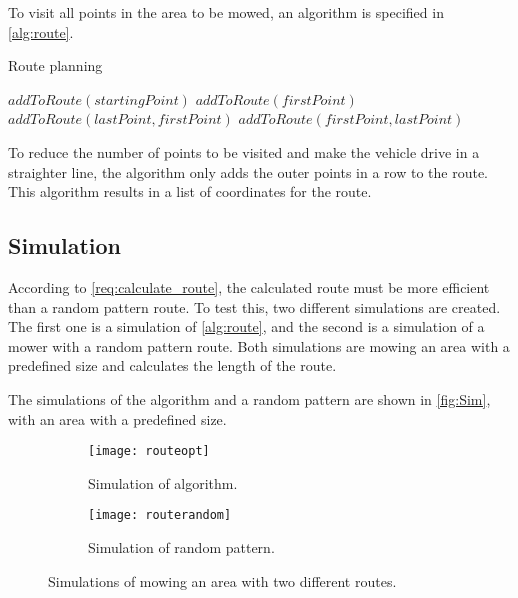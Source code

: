 To visit all points in the area to be mowed, an algorithm is specified in \autoref{alg:route}.
\algrenewcommand{}
\begin{algorithm}[htb]
\caption{Route planning}\label{alg:route}
\begin{algorithmic}[1]
\Statex
{}
   \EndFor
\EndProcedure
\Statex
{}
\State $addToRoute(startingPoint)$
\EndProcedure
\Statex
{}
\State $addToRoute(firstPoint)$
\EndProcedure
\Statex 
{}
\State $addToRoute(lastPoint , firstPoint)$
\EndProcedure
\Statex 
{}
\State $addToRoute(firstPoint , lastPoint)$
\EndProcedure
\EndWhile
\end{algorithmic}
\end{algorithm}
To reduce the number of points to be visited and make the vehicle drive in a straighter line, the algorithm only adds the outer points in a row to the route.
This algorithm results in a list of coordinates for the route.

\subsection{Simulation}\label{subsec:sim}
According to \autoref{req:calculate_route}, the calculated route must be more efficient than a random pattern route. To test this, two different simulations are created. The first one is a simulation of \autoref{alg:route}, and the second is a simulation of a mower with a random pattern route. Both simulations are mowing an area with a predefined size and calculates the length of the route. 

The simulations of the algorithm and a random pattern are shown in \autoref{fig:Sim}, with an area with a predefined size.

\begin{figure}[htb]
    \centering
    \begin{subfigure}[b]{0.45\textwidth}
        \texttt{[image: routeopt]}
        \caption{Simulation of algorithm.}
        \label{fig:simAlg}
    \end{subfigure}
    \begin{subfigure}[b]{0.45\textwidth}
         \texttt{[image: routerandom]}
        \caption{Simulation of random pattern.}
        \label{fig:simRandom}
    \end{subfigure}
    \caption{Simulations of mowing an area with two different routes.}\label{fig:Sim}
\end{figure}

